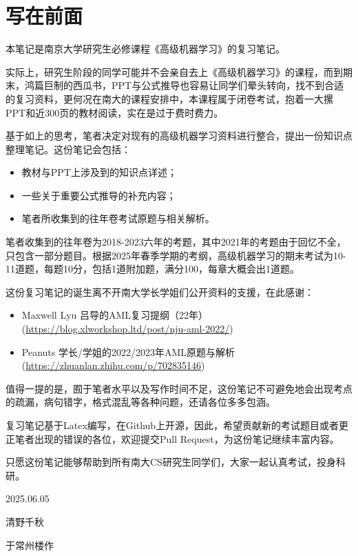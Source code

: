 \chapter*{写在前面} 

本笔记是南京大学研究生必修课程《高级机器学习》的复习笔记。

实际上，研究生阶段的同学可能并不会亲自去上《高级机器学习》的课程，而到期末，鸿篇巨制的西瓜书，PPT与公式推导也容易让同学们晕头转向，找不到合适的复习资料，更何况在南大的课程安排中，本课程属于闭卷考试，抱着一大摞PPT和近300页的教材阅读，实在是过于费时费力。

基于如上的思考，笔者决定对现有的高级机器学习资料进行整合，提出一份知识点整理笔记。这份笔记会包括：
\begin{itemize}
    \item 教材与PPT上涉及到的知识点详述；
    \item 一些关于重要公式推导的补充内容；
    \item 笔者所收集到的往年卷考试原题与相关解析。
\end{itemize}

笔者收集到的往年卷为2018-2023六年的考题，其中2021年的考题由于回忆不全，只包含一部分题目。根据2025年春季学期的考纲，高级机器学习的期末考试为10-11道题，每题10分，包括1道附加题，满分100，每章大概会出1道题。

这份复习笔记的诞生离不开南大学长学姐们公开资料的支援，在此感谢：
\begin{itemize}
    \item Maxwell Lyu 吕导的AML复习提纲（22年）(\url{https://blog.xlworkshop.ltd/post/nju-aml-2022/})
    \item Peanuts 学长/学姐的2022/2023年AML原题与解析(\url{https://zhuanlan.zhihu.com/p/702835146})
\end{itemize}

值得一提的是，囿于笔者水平以及写作时间不足，这份笔记不可避免地会出现考点的疏漏，病句错字，格式混乱等各种问题，还请各位多多包涵。

复习笔记基于Latex编写，在Github上开源，因此，希望贡献新的考试题目或者更正笔者出现的错误的各位，欢迎提交Pull Request，为这份笔记继续丰富内容。

只愿这份笔记能够帮助到所有南大CS研究生同学们，大家一起认真考试，投身科研。

\begin{flushright}
	2025.06.05

    清野千秋

    于常州楼作
\end{flushright}